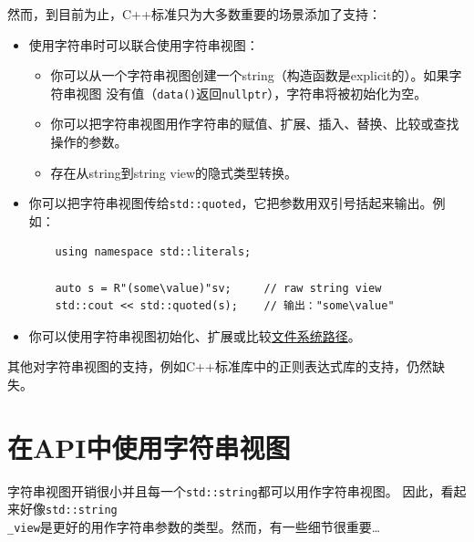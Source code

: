 然而，到目前为止，C++标准只为大多数重要的场景添加了支持：
\begin{itemize}
    \item 使用字符串时可以联合使用字符串视图：
    \begin{itemize}
        \item 你可以从一个字符串视图创建一个string（构造函数是explicit的）。如果字符串视图
        没有值（\texttt{data()}返回\texttt{nullptr}），字符串将被初始化为空。
        \item 你可以把字符串视图用作字符串的赋值、扩展、插入、替换、比较或查找操作的参数。
        \item 存在从string到string view的隐式类型转换。
    \end{itemize}
    \item 你可以把字符串视图传给\texttt{std::quoted}，它把参数用双引号括起来输出。例如：
    \begin{lstlisting}
    using namespace std::literals;

    auto s = R"(some\value)"sv;     // raw string view
    std::cout << std::quoted(s);    // 输出："some\value"
    \end{lstlisting}
    \item 你可以使用字符串视图初始化、扩展或比较\hyperref[ch20.2.3]{文件系统路径}。
\end{itemize}
其他对字符串视图的支持，例如C++标准库中的正则表达式库的支持，仍然缺失。


\section{在API中使用字符串视图}
字符串视图开销很小并且每一个\texttt{std::string}都可以用作字符串视图。
因此，看起来好像\texttt{std::string\\
\_view}是更好的用作字符串参数的类型。然而，有一些细节很重要\ldots

